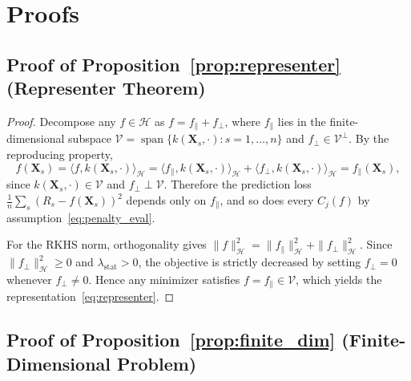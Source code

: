 
\section{Proofs}
\label{app:proofs}

\subsection{Proof of Proposition~\ref{prop:representer} (Representer Theorem)}

\begin{proof}
Decompose any $f \in \mathcal{H}$ as $f = f_{\parallel} + f_{\perp}$,
where $f_{\parallel}$ lies in the finite-dimensional subspace
$\mathcal{V} = \operatorname{span}\{k(\mathbf{X}_s, \cdot) : s = 1, \ldots, n\}$
and $f_{\perp} \in \mathcal{V}^{\perp}$.
By the reproducing property,
\[
f(\mathbf{X}_s)
= \langle f, k(\mathbf{X}_s, \cdot) \rangle_{\mathcal{H}}
= \langle f_{\parallel}, k(\mathbf{X}_s, \cdot) \rangle_{\mathcal{H}}
  + \langle f_{\perp}, k(\mathbf{X}_s, \cdot) \rangle_{\mathcal{H}}
= f_{\parallel}(\mathbf{X}_s),
\]
since $k(\mathbf{X}_s, \cdot) \in \mathcal{V}$ and
$f_{\perp} \perp \mathcal{V}$.
Therefore the prediction loss
$\frac{1}{n}\sum_s (R_s - f(\mathbf{X}_s))^2$
depends only on $f_{\parallel}$, and so does every $C_j(f)$
by assumption~\eqref{eq:penalty_eval}.

For the RKHS norm, orthogonality gives
$\|f\|_{\mathcal{H}}^2 = \|f_{\parallel}\|_{\mathcal{H}}^2 +
\|f_{\perp}\|_{\mathcal{H}}^2$.
Since $\|f_{\perp}\|_{\mathcal{H}}^2 \geq 0$ and
$\lambda_{\mathrm{stat}} > 0$, the objective is strictly decreased
by setting $f_{\perp} = 0$ whenever $f_{\perp} \neq 0$.
Hence any minimizer satisfies $f = f_{\parallel} \in \mathcal{V}$,
which yields the representation~\eqref{eq:representer}.
\end{proof}

\subsection{Proof of Proposition~\ref{prop:finite_dim} (Finite-Dimensional Problem)}

